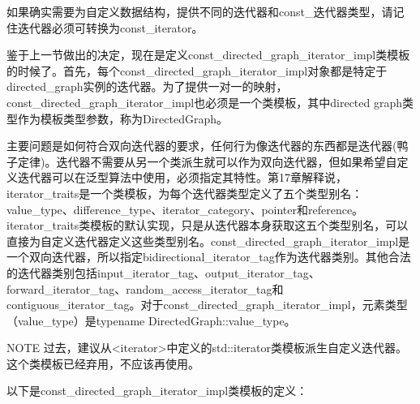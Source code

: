 如果确实需要为自定义数据结构，提供不同的迭代器和const\_迭代器类型，请记住迭代器必须可转换为const\_iterator。


鉴于上一节做出的决定，现在是定义const\_directed\_graph\_iterator\_impl类模板的时候了。首先，每个const\_directed\_graph\_iterator\_impl对象都是特定于directed\_graph实例的迭代器。为了提供一对一的映射，const\_directed\_graph\_iterator\_impl也必须是一个类模板，其中directed graph类型作为模板类型参数，称为DirectedGraph。

主要问题是如何符合双向迭代器的要求，任何行为像迭代器的东西都是迭代器(鸭子定律)。迭代器不需要从另一个类派生就可以作为双向迭代器，但如果希望自定义迭代器可以在泛型算法中使用，必须指定其特性。第17章解释说，iterator\_traits是一个类模板，为每个迭代器类型定义了五个类型别名：value\_type、difference\_type、iterator\_category、pointer和reference。iterator\_traits类模板的默认实现，只是从迭代器本身获取这五个类型别名，可以直接为自定义迭代器定义这些类型别名。const\_directed\_graph\_iterator\_impl是一个双向迭代器，所以指定bidirectional\_iterator\_tag作为迭代器类别。其他合法的迭代器类别包括input\_iterator\_tag、output\_iterator\_tag、forward\_iterator\_tag、random\_access\_iterator\_tag和contiguous\_iterator\_tag。对于const\_directed\_graph\_iterator\_impl，元素类型（value\_type）是typename DirectedGraph::value\_type。

\begin{myNotic}{NOTE}
过去，建议从<iterator>中定义的std::iterator类模板派生自定义迭代器。这个类模板已经弃用，不应该再使用。
\end{myNotic}

以下是const\_directed\_graph\_iterator\_impl类模板的定义：

